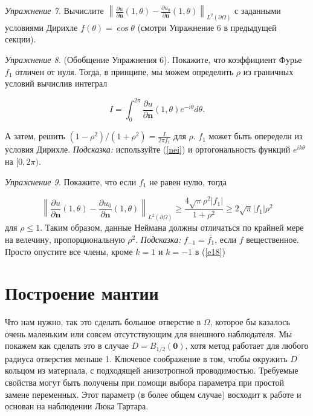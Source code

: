 \documentclass[a4paper, 12pt]{article}
\newcommand{\norm}[1]{\left\lVert#1\right\rVert}
\begin{document}
\textit{Упражнение 7.} Вычислите $\norm{\frac{\partial u}{\partial \textbf{n}}(1, 
\theta) - \frac{\partial
u_0}{\partial \textbf{n}}(1, \theta)}_{L^2(\partial \Omega)}$ с заданными условиями 
Дирихле $f(\theta) =
\cos\theta$ (смотри Упражнение 6 в предыдущей секции).


\textit{Упражнение 8.} (Обобщение Упражнения 6). Покажите, что коэффициент Фурье $f_1$ 
отличен от нуля.
Тогда, в принципе, мы можем определить $\rho$ из граничных условий вычислив интеграл

\begin{equation*}
I = 	\int^{2\pi}_{0}{\frac{\partial u}{\partial \textbf{n}}(1, \theta)e^{-
i\theta}d\theta}.
\end{equation*}

А затем, решить $(1-\rho^2)/(1+\rho^2) = \frac{I}{2\pi f_1}$ для $\rho$. $f_1$ может 
быть опеределн из условия Дирихле.
\textit{Подсказка:} используйте (\ref{nei}) и ортогональность функций $e^{ik\theta}$ 
на $[0, 2\pi)$.

\textit{Упражнение 9.} Покажите, что если $f_1$ не равен нулю, тогда

\begin{equation*}
	\norm{\frac{\partial u}{\partial \textbf{n}}(1, \theta) - \frac{\partial u_0}
	{\partial \textbf{n}}
	(1, \theta)}_{L^2(\partial \Omega)} 	
	\geq \frac{4\sqrt{\pi}\rho^2|f_1|}{1+\rho^2} \geq 2\sqrt{\pi}|f_1|\rho^2
\end{equation*}
для $\rho \le 1$. Таким образом, данные Неймана должны отличаться по крайней мере на 
велечину, пропорциональную $\rho^2$.
\textit{Подсказка:} $f_{-1} = \overline{f_1}$, если $f$ вещественное. Просто опустите 
все члены, кроме $k = 1$ и $k = -1$ в (\ref{e18})

\section{Построение мантии}
Что нам нужно, так это сделать большое отверстие в $\Omega$, которое бы казалось очень 
маленьким или совсем
отсутствующим для внешного наблюдателя. Мы покажем как сделать это в случае $D = 
B_{1/2}(\textbf{0})$, 
хотя метод работает для любого радиуса отверстия меньше 1. Ключевое соображение в том, 
чтобы окружить $D$
кольцом из материала,  с подходящей анизотропной проводимостью.
Требуемые свойства могут быть получены при помощи выбора параметра при простой замене 
переменных.
Этот параметр (в более общем случае) восходит к работе \cite{12} и основан на 
наблюдении Люка Тартара.
\end{document}
